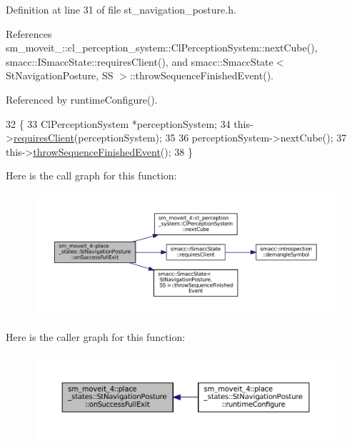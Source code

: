 Definition at line 31 of file st\+\_\+navigation\+\_\+posture.\+h.



References sm\+\_\+moveit\+\_\+::cl\+\_\+perception\+\_\+system\+::\+Cl\+Perception\+System\+::next\+Cube(), smacc\+::\+I\+Smacc\+State\+::requires\+Client(), and smacc\+::\+Smacc\+State$<$ St\+Navigation\+Posture, S\+S $>$\+::throw\+Sequence\+Finished\+Event().



Referenced by runtime\+Configure().


\begin{DoxyCode}
32             \{
33                 ClPerceptionSystem *perceptionSystem;
34                 this->\hyperlink{classsmacc_1_1ISmaccState_a7f95c9f0a6ea2d6f18d1aec0519de4ac}{requiresClient}(perceptionSystem);
35 
36                 perceptionSystem->nextCube();
37                 this->\hyperlink{classsmacc_1_1SmaccState_a49dcfc25824f7e083dd4b999c49ab2b6}{throwSequenceFinishedEvent}();
38             \}
\end{DoxyCode}
Here is the call graph for this function\+:
\nopagebreak
\begin{figure}[H]
\begin{center}
\leavevmode
\includegraphics[width=350pt]{structsm__moveit__4_1_1place__states_1_1StNavigationPosture_a95ab74dae51538aeae46f71b515bc61e_cgraph}
\end{center}
\end{figure}
Here is the caller graph for this function\+:
\nopagebreak
\begin{figure}[H]
\begin{center}
\leavevmode
\includegraphics[width=350pt]{structsm__moveit__4_1_1place__states_1_1StNavigationPosture_a95ab74dae51538aeae46f71b515bc61e_icgraph}
\end{center}
\end{figure}
